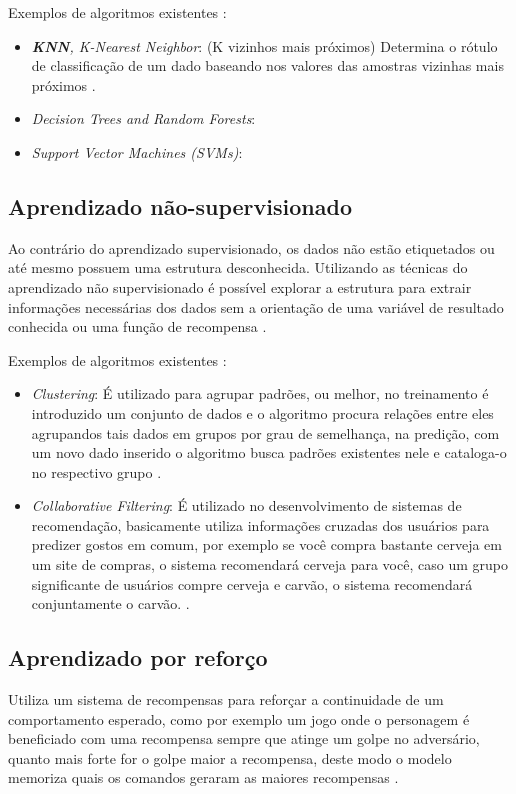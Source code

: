 Exemplos de algoritmos existentes \cite{kirk2014thoughtful}:
\begin{itemize}
    \item \textit{\textbf{KNN}, K-Nearest Neighbor}: (K vizinhos mais próximos) Determina o rótulo de classificação de um dado baseando nos valores das amostras vizinhas mais próximos \cite{kirk2014thoughtful}.
    \item \textit{Decision Trees and Random Forests}: 
    \item \textit{Support Vector Machines (SVMs)}: 
\end{itemize}

\subsection{Aprendizado não-supervisionado}
Ao contrário do aprendizado supervisionado, os dados não estão etiquetados ou até mesmo possuem uma estrutura desconhecida. Utilizando as técnicas do aprendizado não supervisionado é possível explorar a estrutura para extrair informações necessárias dos dados sem a orientação de uma variável de resultado conhecida ou uma função de recompensa \cite{geron2017hands} .

Exemplos de algoritmos existentes \cite{kirk2014thoughtful}:
\begin{itemize}
    \item \textit{Clustering}: É utilizado para agrupar padrões, ou melhor, no treinamento é introduzido um conjunto de dados e o algoritmo procura relações entre eles agrupandos tais dados em grupos por grau de semelhança, na predição, com um novo dado inserido o algoritmo busca padrões existentes nele e cataloga-o no respectivo grupo \cite{kirk2014thoughtful}.   
    \item \textit{Collaborative Filtering}: É utilizado no desenvolvimento de sistemas de recomendação, basicamente utiliza informações cruzadas dos usuários para predizer gostos em comum, por exemplo se você compra bastante cerveja em um site de compras, o sistema recomendará cerveja para você, caso um grupo significante de usuários compre cerveja e carvão, o sistema recomendará conjuntamente o carvão. \cite{kirk2014thoughtful}.  
\end{itemize}

\subsection{Aprendizado por reforço} 
Utiliza um sistema de recompensas para reforçar a continuidade de um comportamento esperado, como por exemplo um jogo onde o personagem é beneficiado com uma recompensa sempre que atinge um golpe no adversário, quanto mais forte for o golpe maior a recompensa, deste modo o modelo memoriza quais os comandos geraram as maiores recompensas \cite{kirk2014thoughtful}.

